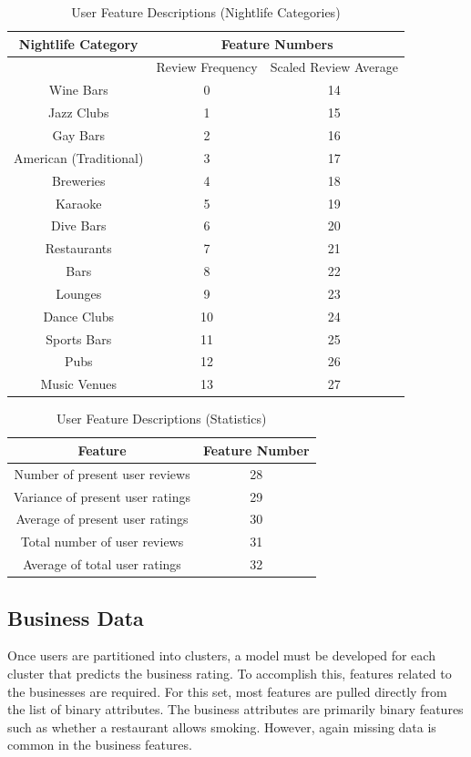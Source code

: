 \documentclass[11pt]{article}
\begin{document}
\begin{table}[h!]
	\caption{User Feature Descriptions (Nightlife Categories)}
	\centering
	\begin{tabular}{c|c|c}
		Nightlife Category & \multicolumn{2}{c}{Feature Numbers} \\ \hline
		& Review Frequency & Scaled Review Average \\
		Wine Bars & 0 & 14 \\
		Jazz Clubs & 1 & 15\\
		Gay Bars & 2 & 16\\
		American (Traditional) & 3 & 17\\
		Breweries & 4 & 18\\
		Karaoke & 5 & 19\\
		Dive Bars & 6 & 20\\
		Restaurants & 7 & 21\\
		Bars & 8 & 22\\
		Lounges & 9 & 23\\
		Dance Clubs & 10 & 24\\
		Sports Bars & 11 & 25\\
		Pubs & 12 & 26\\
		Music Venues & 13 & 27\\
	\end{tabular}
	\label{tab:user_features2}
\end{table}

\begin{table}[h!]
	\caption{User Feature Descriptions (Statistics)}
	\centering
	\begin{tabular}{c|c}
		Feature & Feature Number \\ \hline
		Number of present user reviews & 28 \\
		Variance of present user ratings & 29 \\
		Average of present user ratings & 30 \\
		Total number of user reviews & 31 \\
		Average of total user ratings & 32 \\
	\end{tabular}
	\label{tab:user_features3}
\end{table}

\subsection{Business Data}

Once users are partitioned into clusters, a model must be developed for each cluster that predicts the business rating. To accomplish this, features related to the businesses are required. For this set, most features are pulled directly from the list of binary attributes. The business attributes are primarily binary features such as whether a restaurant allows smoking. However, again missing data is common in the business features.
\end{document}
